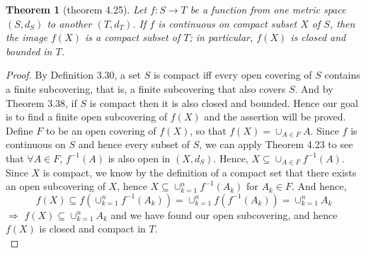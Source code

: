 \documentclass[aps,pra,notitlepage,amsmath,amssymb,letterpaper,12pt]{revtex4-1}
\newtheorem{theorem}{Theorem}
\begin{document}
\begin{theorem}[theorem 4.25]
Let $f:S \to T$  be a function from one metric space $(S,d_{S})$ to another $(T,d_{T})$. If $f$ is continuous on compact subset $X$ of $S$, then the image $f(X)$ is a compact subset of $T$; in particular, $f(X)$ is closed and bounded in $T$.
\end{theorem}
\begin{proof}
By Definition 3.30, a set $S$ is compact iff every open covering of $S$ contains a finite subcovering, that is, a finite subcovering that also covers $S$. And by Theorem 3.38, if $S$ is compact then it is also closed and bounded.
\newline{}
Hence our goal is to find a finite open subcovering of $f(X)$ and the assertion will be proved. Define $F$ to be an open covering of $f(X)$, so that $f(X) = \cup_{A \in F}A$. Since $f$ is continuous on $S$ and hence every subset of $S$, we can apply Theorem 4.23 to see that $\forall A \in F$, $f^{-1}(A)$ is also open in $(X,d_{S})$. Hence, $X \subseteq \cup_{A \in F}f^{-1}(A) $. Since $X$ is compact, we know by the definition of a compact set that there exists an open subcovering of $X$, hence $X \subseteq \cup_{k = 1}^{n}f^{-1}(A_{k}) $ for $A_{k} \in F$. And hence,
$$ f(X) \subseteq f(\cup_{k = 1}^{n}f^{-1}(A_{k})) = \cup_{k = 1}^{n}f(f^{-1}(A_{k})) = \cup_{k = 1}^{n}A_{k} $$
$\Rightarrow$ $f(X) \subseteq\cup_{k = 1}^{n}A_{k}$ and we have found our open subcovering, and hence $f(X)$ is closed and compact in $T$.
$$ $$
\end{proof}
\end{document}
